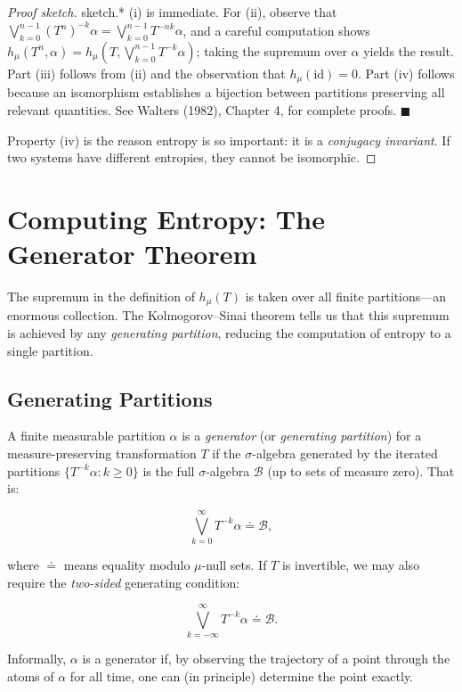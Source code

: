 \begin{proof}[Proof sketch]
sketch.* (i) is immediate. For (ii), observe that $\bigvee_{k=0}^{n-1}(T^n)^{-k}\alpha = \bigvee_{k=0}^{n-1} T^{-nk}\alpha$, and a careful computation shows $h_\mu(T^n, \alpha) = h_\mu(T, \bigvee_{k=0}^{n-1} T^{-k}\alpha)$; taking the supremum over $\alpha$ yields the result. Part (iii) follows from (ii) and the observation that $h_\mu(\mathrm{id}) = 0$. Part (iv) follows because an isomorphism establishes a bijection between partitions preserving all relevant quantities. See Walters (1982), Chapter 4, for complete proofs. $\blacksquare$

Property (iv) is the reason entropy is so important: it is a \textit{conjugacy invariant}. If two systems have different entropies, they cannot be isomorphic.


\bigskip


\end{proof}

\section{Computing Entropy: The Generator Theorem}\label{sec:11.5}

The supremum in the definition of $h_\mu(T)$ is taken over all finite partitions---an enormous collection. The Kolmogorov--Sinai theorem tells us that this supremum is achieved by any \textit{generating partition}, reducing the computation of entropy to a single partition.

\subsection{Generating Partitions}\label{sec:11.5.1}

\begin{definition}\label{def:11.17}
A finite measurable partition $\alpha$ is a \textit{generator} (or \textit{generating partition}) for a measure-preserving transformation $T$ if the $\sigma$-algebra generated by the iterated partitions $\{T^{-k}\alpha : k \geq 0\}$ is the full $\sigma$-algebra $\mathcal{B}$ (up to sets of measure zero). That is:

\[
\bigvee_{k=0}^{\infty} T^{-k}\alpha \doteq \mathcal{B},
\]

where $\doteq$ means equality modulo $\mu$-null sets. If $T$ is invertible, we may also require the \textit{two-sided} generating condition:

\[
\bigvee_{k=-\infty}^{\infty} T^{-k}\alpha \doteq \mathcal{B}.
\]

Informally, $\alpha$ is a generator if, by observing the trajectory of a point through the atoms of $\alpha$ for all time, one can (in principle) determine the point exactly.
\end{definition}


